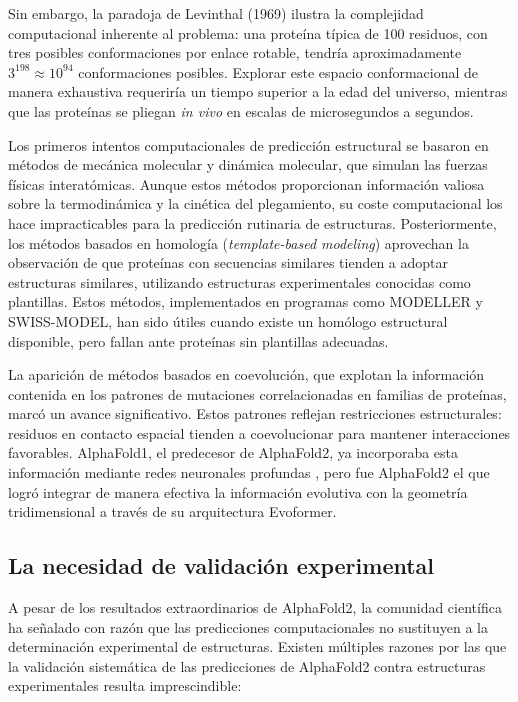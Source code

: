 Sin embargo, la paradoja de Levinthal (1969) ilustra la complejidad computacional inherente al problema: una prote\'ina t\'ipica de 100 residuos, con tres posibles conformaciones por enlace rotable, tendr\'ia aproximadamente $3^{198} \approx 10^{94}$ conformaciones posibles. Explorar este espacio conformacional de manera exhaustiva requerir\'ia un tiempo superior a la edad del universo, mientras que las prote\'inas se pliegan \textit{in vivo} en escalas de microsegundos a segundos.

Los primeros intentos computacionales de predicci\'on estructural se basaron en m\'etodos de mec\'anica molecular y din\'amica molecular, que simulan las fuerzas f\'isicas interat\'omicas. Aunque estos m\'etodos proporcionan informaci\'on valiosa sobre la termodin\'amica y la cin\'etica del plegamiento, su coste computacional los hace impracticables para la predicci\'on rutinaria de estructuras. Posteriormente, los m\'etodos basados en homolog\'ia (\textit{template-based modeling}) aprovechan la observaci\'on de que prote\'inas con secuencias similares tienden a adoptar estructuras similares, utilizando estructuras experimentales conocidas como plantillas. Estos m\'etodos, implementados en programas como MODELLER y SWISS-MODEL, han sido \'utiles cuando existe un hom\'ologo estructural disponible, pero fallan ante prote\'inas sin plantillas adecuadas.

La aparici\'on de m\'etodos basados en coevoluci\'on, que explotan la informaci\'on contenida en los patrones de mutaciones correlacionadas en familias de prote\'inas, marc\'o un avance significativo. Estos patrones reflejan restricciones estructurales: residuos en contacto espacial tienden a coevolucionar para mantener interacciones favorables. AlphaFold1, el predecesor de AlphaFold2, ya incorporaba esta informaci\'on mediante redes neuronales profundas \citep{senior2020improved}, pero fue AlphaFold2 el que logr\'o integrar de manera efectiva la informaci\'on evolutiva con la geometr\'ia tridimensional a trav\'es de su arquitectura Evoformer.

\subsection{La necesidad de validaci\'on experimental}
\label{subsec:necesidad_validacion}

A pesar de los resultados extraordinarios de AlphaFold2, la comunidad cient\'ifica ha se\~nalado con raz\'on que las predicciones computacionales no sustituyen a la determinaci\'on experimental de estructuras. Existen m\'ultiples razones por las que la validaci\'on sistem\'atica de las predicciones de AlphaFold2 contra estructuras experimentales resulta imprescindible:

